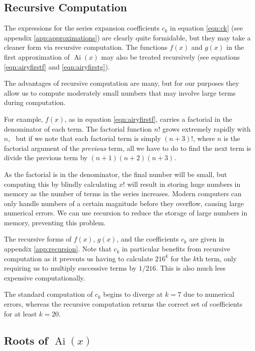 \documentclass[]{article}
\newcommand{\Ai}[1]{\ensuremath{\operatorname{Ai}({#1})}}
\begin{document}
\subsection{Recursive Computation}\label{ssec:recursion}

The expressions for the series expansion coefficients $c_{k}$ in equation \ref{eqn:ck} (see appendix \ref{app:approximations}) are clearly quite formidable, but they may take a cleaner form via recursive computation. The functions $f(x)$ and $g(x)$ in the first approximation of $\Ai{x}$ may also be treated recursively (see equations \ref{eqn:airyfirstf} and \ref{eqn:airyfirstg}).

The advantages of recursive computation are many, but for our purposes they allow us to compute moderately small numbers that may involve large terms during computation.

For example, $f(x)$, as in equation \ref{eqn:airyfirstf}, carries a factorial in the denominator of each term. The factorial function $n!$ grows extremely rapidly with $n$,\footnotemark~ but if we note that each factorial term is simply $(n+3)!$, where $n$ is the factorial argument of the \emph{previous} term, all we have to do to find the next term is divide the previous term by $(n+1)(n+2)(n+3)$.


As the factorial is in the denominator, the final number will be small, but computing this by blindly calculating $x!$ will result in storing huge numbers in memory as the number of terms in the series increases. Modern computers can only handle numbers of a certain magnitude before they overflow, causing large numerical errors. We can use recursion to reduce the storage of large numbers in memory, preventing this problem.

The recursive forms of $f(x)$, $g(x)$, and the coefficients $c_{k}$ are given in appendix \ref{app:recursion}. Note that $c_{k}$ in particular benefits from recursive computation as it prevents us having to calculate $216^{k}$ for the $k$th term, only requiring us to multiply successive terms by $1/216$. This is also much less expensive computationally. 

The standard computation of $c_{k}$ begins to diverge at $k = 7$ due to numerical errors, whereas the recursive computation returns the correct set of coefficients for at least $k = 20$.

\subsection{Roots of \Ai{x}}
\end{document}
